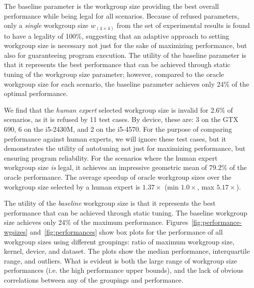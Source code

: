 The baseline parameter is the workgroup size providing the best
overall performance while being legal for all scenarios. Because of
refused parameters, only a \emph{single} workgroup size
$w_{(4 \times 4)}$ from the set of experimental results is found to
have a legality of 100\%, suggesting that an adaptive approach to
setting workgroup size is necessary not just for the sake of
maximizing performance, but also for guaranteeing program
execution. The utility of the baseline parameter is that it represents
the best performance that can be achieved through static tuning of the
workgroup size parameter; however, compared to the oracle workgroup
size for each scenario, the baseline parameter achieves only 24\% of
the optimal performance.


We find that the \emph{human expert} selected workgroup size is
invalid for 2.6\% of scenarios, as it is refused by 11 test cases. By
device, these are: 3 on the GTX 690, 6 on the i5-2430M, and 2 on the
i5-4570. For the purpose of comparing performance against human
experts, we will ignore these test cases, but it demonstrates the
utility of autotuning not just for maximizing performance, but
ensuring program reliability. For the scenarios where the human expert
workgroup size \emph{is} legal, it achieves an impressive geometric
mean of 79.2\% of the oracle performance. The average speedup of
oracle workgroup sizes over the workgroup size selected by a human
expert is $1.37\times$ (min $1.0\times$, max $5.17\times$).

The utility of the \emph{baseline} workgroup size is that it
represents the best performance that can be achieved through static
tuning. The baseline workgroup size achieves only 24\% of the maximum
performance. Figures~\ref{fig:performance-wgsizes}
and~\ref{fig:performances} show box plots for the performance of all
workgroup sizes using different groupings: ratio of maximum workgroup
size, kernel, device, and dataset. The plots show the median
performance, interquartile range, and outliers. What is evident is
both the large range of workgroup size performances (i.e. the high
performance upper bounds), and the lack of obvious correlations
between any of the groupings and performance.

